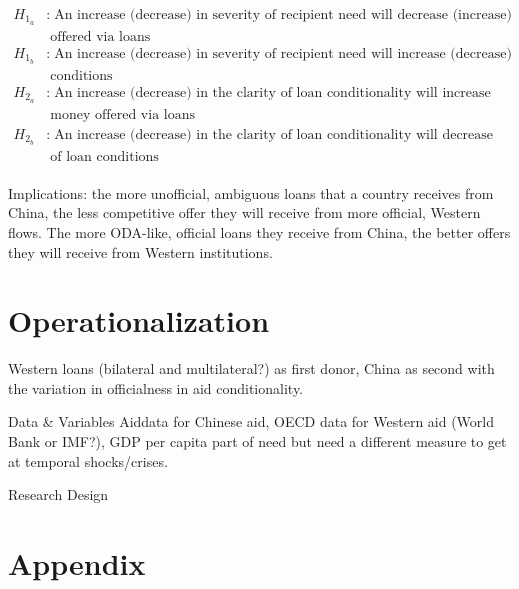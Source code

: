 \documentclass{article}
\begin{document}
\begin{align*}
    H_{1_a}&:\;\text{An increase (decrease) in severity of recipient need will decrease (increase) the amount of money}\\
    &\;\text{offered via loans}\\
    H_{1_b}&:\;\text{An increase (decrease) in severity of recipient need will increase (decrease) the stringency of loan}\\
    &\;\text{conditions}\\
    H_{2_a}&:\;\text{An increase (decrease) in the clarity of loan conditionality will increase (decrease) the amount of}\\
    &\;\text{money offered via loans}\\
    H_{2_b}&:\;\text{An increase (decrease) in the clarity of loan conditionality will decrease (increase) the stringency}\\
    &\;\text{of loan conditions}\\
\end{align*}



Implications: the more unofficial, ambiguous loans that a country receives from China, the less competitive offer they will receive from more official, Western flows. The more ODA-like, official loans they receive from China, the better offers they will receive from Western institutions.

\section*{Operationalization}
Western loans (bilateral and multilateral?) as first donor, China as second with the variation in officialness in aid conditionality.

Data \& Variables
Aiddata for Chinese aid, OECD data for Western aid (World Bank or IMF?), GDP per capita part of need but need a different measure to get at temporal shocks/crises.

Research Design

\pagebreak
\section*{Appendix}
\end{document}
